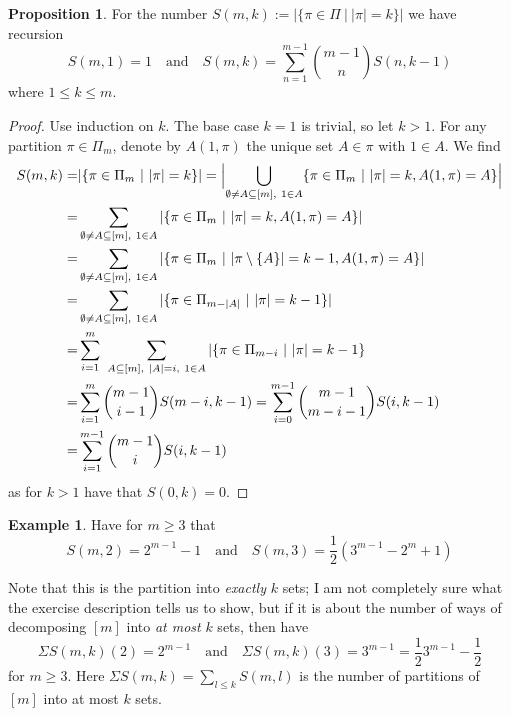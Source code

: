 \documentclass{scrartcl}
\theoremstyle{definition}
\newtheorem{proposition}[definition]{Proposition}
\newtheorem{example}[definition]{Example}
\begin{document}
\begin{proposition}
    \label{prop:partitions_recursion}
    For the number $S(m, k) := |\{ \pi \in \Pi \ | \ |\pi| = k\}|$ we have recursion
    \begin{equation*}
        S(m, 1) = 1 \quad \text{and} \quad S(m, k) = \sum_{n = 1}^{m - 1} {m - 1 \choose n} S(n, k - 1)
    \end{equation*}
    where $1 \leq k \leq m$.
\end{proposition}
\begin{proof}
    Use induction on $k$. 
    The base case $k = 1$ is trivial, so let $k > 1$.
    For any partition $\pi \in \Pi_m$, denote by $A(1, \pi)$ the unique set $A \in \pi$ with $1 \in A$.
    We find
    \begin{align*}
        S(m, k) =& |\{ \pi \in \Pi_m \ | \ |\pi| = k \}| = \Bigl| \bigcup_{\emptyset \neq A \subseteq [m], \ 1 \in A} \{ \pi \in \Pi_m \ | \ |\pi| = k, A(1, \pi) = A \} \Bigr| \\
        =& \sum_{\emptyset \neq A \subseteq [m], \ 1 \in A} |\{ \pi \in \Pi_m \ | \ |\pi| = k, A(1, \pi) = A \}| \\
        =& \sum_{\emptyset \neq A \subseteq [m], \ 1 \in A} |\{ \pi \in \Pi_m \ | \ |\pi \setminus \{A\}| = k - 1, A(1, \pi) = A\}| \\
        =& \sum_{\emptyset \neq A \subseteq [m], \ 1 \in A} |\{ \pi \in \Pi_{m - |A|} \ | \ |\pi| = k - 1 \}| \\
        =& \sum_{i = 1}^m \ \sum_{A \subseteq [m], \ |A| = i, \ 1 \in A} |\{ \pi \in \Pi_{m - i} \ | \ |\pi| = k - 1 \} \\
        =& \sum_{i = 1}^m {m - 1 \choose i - 1} S(m - i, k - 1) = \sum_{i = 0}^{m - 1} {m - 1 \choose m - i - 1} S(i, k - 1) \\
        =& \sum_{i = 1}^{m - 1} {m - 1 \choose i} S(i, k - 1)
    \end{align*}
    as for $k > 1$ have that $S(0, k) = 0$.
\end{proof}
\begin{example}
    Have for $m \geq 3$ that
    \begin{equation*}
        S(m, 2) = 2^{m - 1} - 1 \quad \text{and} \quad S(m, 3) = \frac 1 2 (3^{m - 1} - 2^m + 1)
    \end{equation*}

    Note that this is the partition into \emph{exactly} $k$ sets; 
    I am not completely sure what the exercise description tells us to show, but if it is about the number of ways of decomposing $[m]$ into \emph{at most} $k$ sets, then have
    \begin{equation*}
        \Sigma S(m, k)(2) = 2^{m - 1} \quad \text{and} \quad \Sigma S(m, k)(3) = 3^{m - 1} = \frac 1 2 3^{m - 1} - \frac 1 2
    \end{equation*}
    for $m \geq 3$.
    Here $\Sigma S(m, k) = \sum_{l \leq k} S(m, l)$ is the number of partitions of $[m]$ into at most $k$ sets.
\end{example}
\end{document}
